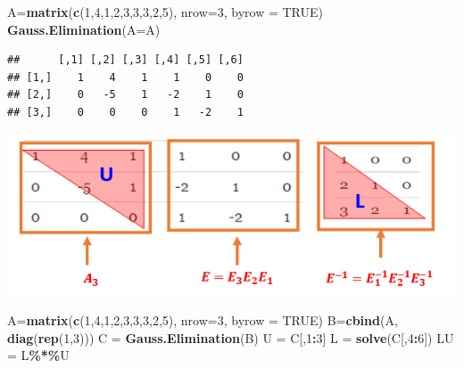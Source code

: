\documentclass[
]{book}
\newenvironment{Shaded}{\begin{snugshade}}{\end{snugshade}}
\newcommand{\AttributeTok}[1]{\textcolor[rgb]{0.13,0.29,0.53}{#1}}
\newcommand{\ConstantTok}[1]{\textcolor[rgb]{0.56,0.35,0.01}{#1}}
\newcommand{\DecValTok}[1]{\textcolor[rgb]{0.00,0.00,0.81}{#1}}
\newcommand{\FunctionTok}[1]{\textcolor[rgb]{0.13,0.29,0.53}{\textbf{#1}}}
\newcommand{\NormalTok}[1]{#1}
\newcommand{\OtherTok}[1]{\textcolor[rgb]{0.56,0.35,0.01}{#1}}
\newcommand{\SpecialCharTok}[1]{\textcolor[rgb]{0.81,0.36,0.00}{\textbf{#1}}}
\begin{document}
\begin{Shaded}
\begin{Highlighting}[]
\NormalTok{A}\OtherTok{=}\FunctionTok{matrix}\NormalTok{(}\FunctionTok{c}\NormalTok{(}\DecValTok{1}\NormalTok{,}\DecValTok{4}\NormalTok{,}\DecValTok{1}\NormalTok{,}\DecValTok{2}\NormalTok{,}\DecValTok{3}\NormalTok{,}\DecValTok{3}\NormalTok{,}\DecValTok{3}\NormalTok{,}\DecValTok{2}\NormalTok{,}\DecValTok{5}\NormalTok{), }\AttributeTok{nrow=}\DecValTok{3}\NormalTok{, }\AttributeTok{byrow =} \ConstantTok{TRUE}\NormalTok{)}
\FunctionTok{Gauss.Elimination}\NormalTok{(}\AttributeTok{A=}\NormalTok{A)}
\end{Highlighting}
\end{Shaded}

\begin{verbatim}
##      [,1] [,2] [,3] [,4] [,5] [,6]
## [1,]    1    4    1    1    0    0
## [2,]    0   -5    1   -2    1    0
## [3,]    0    0    0    1   -2    1
\end{verbatim}

\begin{center}\includegraphics[width=0.75\linewidth]{img09/w09-LU-Example} \end{center}

\begin{Shaded}
\begin{Highlighting}[]
\NormalTok{A}\OtherTok{=}\FunctionTok{matrix}\NormalTok{(}\FunctionTok{c}\NormalTok{(}\DecValTok{1}\NormalTok{,}\DecValTok{4}\NormalTok{,}\DecValTok{1}\NormalTok{,}\DecValTok{2}\NormalTok{,}\DecValTok{3}\NormalTok{,}\DecValTok{3}\NormalTok{,}\DecValTok{3}\NormalTok{,}\DecValTok{2}\NormalTok{,}\DecValTok{5}\NormalTok{), }\AttributeTok{nrow=}\DecValTok{3}\NormalTok{, }\AttributeTok{byrow =} \ConstantTok{TRUE}\NormalTok{)}
\NormalTok{B}\OtherTok{=}\FunctionTok{cbind}\NormalTok{(A, }\FunctionTok{diag}\NormalTok{(}\FunctionTok{rep}\NormalTok{(}\DecValTok{1}\NormalTok{,}\DecValTok{3}\NormalTok{)))}
\NormalTok{C }\OtherTok{=} \FunctionTok{Gauss.Elimination}\NormalTok{(B)}
\NormalTok{U }\OtherTok{=}\NormalTok{ C[,}\DecValTok{1}\SpecialCharTok{:}\DecValTok{3}\NormalTok{]}
\NormalTok{L }\OtherTok{=} \FunctionTok{solve}\NormalTok{(C[,}\DecValTok{4}\SpecialCharTok{:}\DecValTok{6}\NormalTok{])}
\NormalTok{LU }\OtherTok{=}\NormalTok{ L}\SpecialCharTok{\%*\%}\NormalTok{U}
\end{Highlighting}
\end{Shaded}
\end{document}
